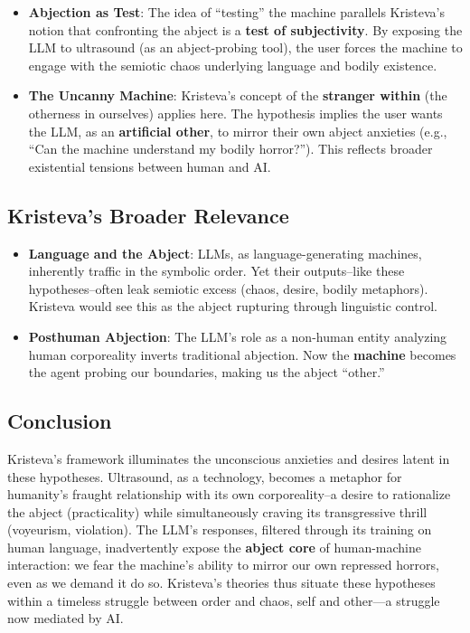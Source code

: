 \documentclass{llncs}
\begin{document}
\begin{itemize}
\item
\textbf{Abjection as Test}: The idea of “testing” the machine parallels
 Kristeva’s notion that confronting the abject is a \textbf{test of
subjectivity}. By exposing the LLM to ultrasound (as an abject-probing tool),
the user forces the machine to engage with the semiotic chaos underlying
language and bodily existence.
\item
\textbf{The Uncanny Machine}: Kristeva’s concept of the \textbf{stranger
within} (the otherness in ourselves) applies here. The hypothesis implies the
user wants the LLM, as an \textbf{artificial other}, to mirror their own abject
anxieties (e.g., ``Can the machine understand my bodily horror?''). This
reflects broader existential tensions between human and AI.
\end{itemize}

\subsection*{Kristeva’s Broader Relevance}

\begin{itemize}
\item
\textbf{Language and the Abject}: LLMs, as language-generating machines, 
inherently traffic in the symbolic order. Yet their outputs--like these
hypotheses--often leak semiotic excess (chaos, desire, bodily metaphors).
Kristeva would see this as the abject rupturing through linguistic control.
\item
\textbf{Posthuman Abjection}: The LLM’s role as a non-human entity analyzing
human corporeality inverts traditional abjection. Now the \textbf{machine}
becomes the agent probing our boundaries, making us the abject ``other.''
\end{itemize}

\subsection*{Conclusion}

Kristeva’s framework illuminates the unconscious anxieties and desires latent
in these hypotheses. Ultrasound, as a technology, becomes a metaphor for
humanity’s fraught relationship with its own corporeality--a desire to
rationalize the abject (practicality) while simultaneously craving its
transgressive thrill (voyeurism, violation). The LLM’s responses, filtered
through its training on human language, inadvertently expose the \textbf{abject
core} of human-machine interaction: we fear the machine’s ability to mirror our
own repressed horrors, even as we demand it do so. Kristeva’s theories thus
situate these hypotheses within a timeless struggle between order and chaos,
self and other—a struggle now mediated by AI.
\end{document}
